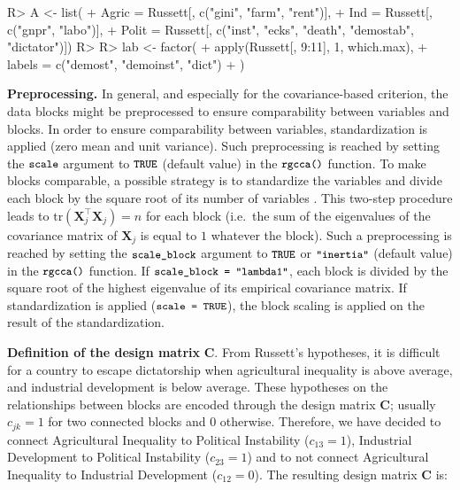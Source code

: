 \documentclass[
]{jss}
\begin{document}
\footnotesize

\begin{CodeChunk}
\begin{CodeInput}
R> A <- list(
+   Agric = Russett[, c("gini", "farm", "rent")],
+   Ind = Russett[, c("gnpr", "labo")],
+   Polit = Russett[, c("inst", "ecks",  "death", "demostab", "dictator")])
R> 
R> lab <- factor(
+   apply(Russett[, 9:11], 1, which.max),
+   labels = c("demost", "demoinst", "dict")
+ )
\end{CodeInput}
\end{CodeChunk}

\normalsize

\textbf{Preprocessing.} In general, and especially for the
covariance-based criterion, the data blocks might be preprocessed to
ensure comparability between variables and blocks. In order to ensure
comparability between variables, standardization is applied (zero mean
and unit variance). Such preprocessing is reached by setting the
\(\small{\texttt{scale}}\) argument to \(\small{\texttt{TRUE}}\)
(default value) in the \(\small{\texttt{rgcca()}}\) function. To make
blocks comparable, a possible strategy is to standardize the variables
and divide each block by the square root of its number of variables
\citep{Westerhuis1998}. This two-step procedure leads to
\(\mathrm{tr}(\mathbf X_j^\top \mathbf X_j )=n\) for each block
(i.e.~the sum of the eigenvalues of the covariance matrix of
\(\mathbf X_j\) is equal to \(1\) whatever the block). Such a
preprocessing is reached by setting the \(\small \texttt{scale\_block}\)
argument to \(\small \texttt{TRUE}\) or \(\small{\texttt{"inertia"}}\)
(default value) in the \(\small{\texttt{rgcca()}}\) function. If
\(\small{\texttt{scale\_block = "lambda1"}}\), each block is divided by
the square root of the highest eigenvalue of its empirical covariance
matrix. If standardization is applied
(\(\small{\texttt{scale = TRUE}}\)), the block scaling is applied on the
result of the standardization.

\textbf{Definition of the design matrix} \(\mathbf{C}\). From Russett's
hypotheses, it is difficult for a country to escape dictatorship when
agricultural inequality is above average, and industrial development is
below average. These hypotheses on the relationships between blocks are
encoded through the design matrix \(\mathbf{C}\); usually \(c_{jk} = 1\)
for two connected blocks and \(0\) otherwise. Therefore, we have decided
to connect Agricultural Inequality to Political Instability
(\(c_{13} = 1\)), Industrial Development to Political Instability
(\(c_{23} = 1\)) and to not connect Agricultural Inequality to
Industrial Development (\(c_{12} = 0\)). The resulting design matrix
\(\mathbf{C}\) is:
\end{document}
